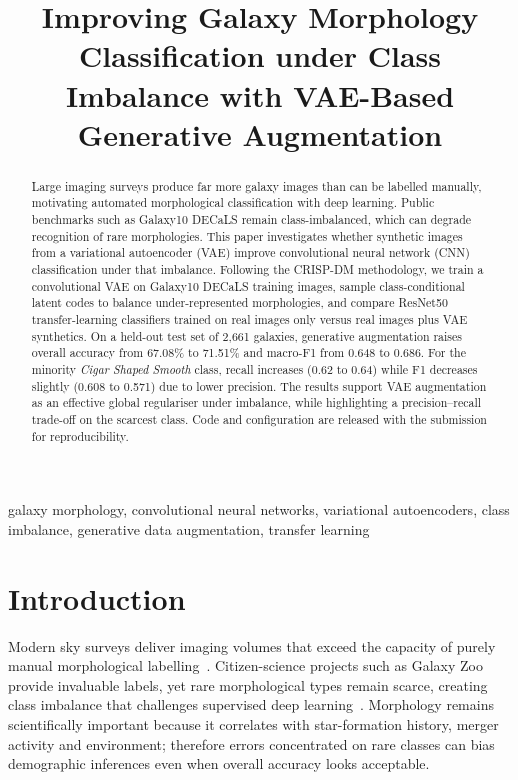 \documentclass[conference]{IEEEtran}
\begin{document}
\title{Improving Galaxy Morphology Classification under Class Imbalance with VAE-Based Generative Augmentation}

\author{
}

\maketitle

\begin{abstract}
Large imaging surveys produce far more galaxy images than can be labelled manually, motivating automated morphological classification with deep learning. Public benchmarks such as Galaxy10 DECaLS remain class-imbalanced, which can degrade recognition of rare morphologies. This paper investigates whether synthetic images from a variational autoencoder (VAE) improve convolutional neural network (CNN) classification under that imbalance. Following the CRISP-DM methodology, we train a convolutional VAE on Galaxy10 DECaLS training images, sample class-conditional latent codes to balance under-represented morphologies, and compare ResNet50 transfer-learning classifiers trained on real images only versus real images plus VAE synthetics. On a held-out test set of 2{,}661 galaxies, generative augmentation raises overall accuracy from 67.08\% to 71.51\% and macro-F1 from 0.648 to 0.686. For the minority \emph{Cigar Shaped Smooth} class, recall increases (0.62 to 0.64) while F1 decreases slightly (0.608 to 0.571) due to lower precision. The results support VAE augmentation as an effective global regulariser under imbalance, while highlighting a precision--recall trade-off on the scarcest class. Code and configuration are released with the submission for reproducibility.
\end{abstract}

\begin{IEEEkeywords}
galaxy morphology, convolutional neural networks, variational autoencoders, class imbalance, generative data augmentation, transfer learning
\end{IEEEkeywords}

\section{Introduction}
Modern sky surveys deliver imaging volumes that exceed the capacity of purely manual morphological labelling~\cite{lintott2008galaxy,willett2013galaxy}. Citizen-science projects such as Galaxy Zoo provide invaluable labels, yet rare morphological types remain scarce, creating class imbalance that challenges supervised deep learning~\cite{he2016deep,aggarwal2018neural}. Morphology remains scientifically important because it correlates with star-formation history, merger activity and environment; therefore errors concentrated on rare classes can bias demographic inferences even when overall accuracy looks acceptable.
\end{document}
